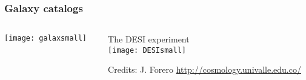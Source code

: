 \begin{frame}
  \frametitle{Galaxy catalogs}
  \begin{columns}
  \begin{column}{0.65\textwidth}
  \texttt{[image: galaxsmall]}     
  \end{column}
  \begin{column}{0.35\textwidth}
    The DESI experiment\\
    \texttt{[image: DESIsmall]}
    
    {\tiny Credits: J. Forero \url{http://cosmology.univalle.edu.co/} }
  \end{column}
\end{columns}


\end{frame}



